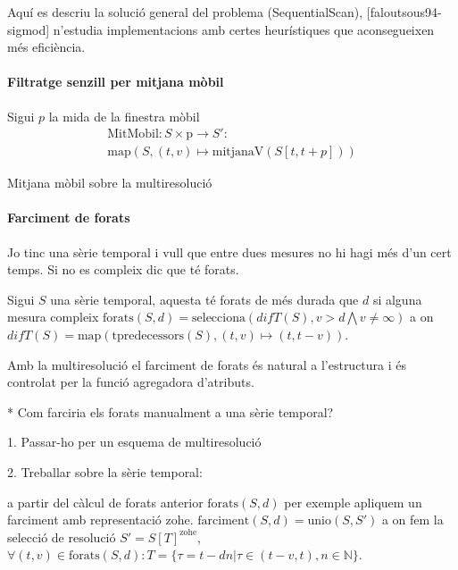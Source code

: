 Aquí es descriu la solució general del problema (SequentialScan),
[faloutsous94-sigmod] n'estudia implementacions amb certes
heurístiques que aconsegueixen més eficiència.





\paragraph{Filtratge senzill per mitjana mòbil}

Sigui $p$ la mida de la finestra mòbil
\begin{gather*}
  \text{MitMobil}: S \times \text{p} \longrightarrow S':\\
  \text{map}(S,(t,v)\mapsto \text{mitjanaV}(S[t,t+p]))
\end{gather*}


Mitjana mòbil sobre la multiresolució



\paragraph{Farciment de forats}

Jo tinc una sèrie temporal i vull que entre dues mesures no hi hagi més d'un cert temps. Si no es compleix dic que té forats. 

Sigui $S$ una sèrie temporal, aquesta té forats de més durada que $d$
si alguna mesura compleix $\text{forats}(S,d) = \text{selecciona}(difT(S),v>d \bigwedge v\neq\infty)$ a on $difT(S) = \text{map}(\text{tpredecessors}(S),(t,v)\mapsto(t,t-v))$.

Amb la multiresolució el farciment de forats és natural a l'estructura i és controlat per la funció agregadora d'atributs.


* Com farciria els forats manualment a una sèrie temporal?

1. Passar-ho per un esquema de multiresolució

2. Treballar sobre la sèrie temporal:

a partir del càlcul de forats anterior $\text{forats}(S,d)$ per
exemple apliquem un farciment amb representació
zohe. $\text{farciment}(S,d) = \text{unio}(S,S')$ a on fem la selecció
de resolució $S' = S[T]^{\text{zohe}}$, $\forall (t,v) \in
\text{forats}(S,d): T = \{ \tau = t - dn |
\tau\in(t-v,t),n\in\mathbb{N} \}$.







